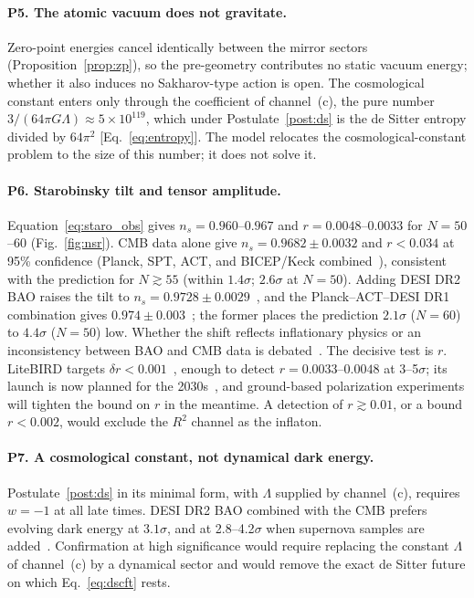\documentclass[reprint,aps,prd,amsmath,amssymb,superscriptaddress,nofootinbib,floatfix]{revtex4-2}
\theoremstyle{plain}
\theoremstyle{definition}
\theoremstyle{remark}
\begin{document}
\paragraph*{P5. The atomic vacuum does not gravitate.} Zero-point energies cancel identically between the mirror
sectors (Proposition~\ref{prop:zp}), so the pre-geometry contributes no static vacuum energy; whether it also induces no
Sakharov-type action is open. The cosmological constant enters only through the coefficient of channel~(c), the pure
number $3/(64\pi G\Lambda)\approx5\times10^{119}$, which under Postulate~\ref{post:ds} is the de Sitter entropy divided by $64\pi^2$
[Eq.~\eqref{eq:entropy}]. The model relocates the cosmological-constant problem to the size of this number; it does
not solve it.

\paragraph*{P6. Starobinsky tilt and tensor amplitude.} Equation~\eqref{eq:staro_obs} gives $n_s=0.960$--$0.967$ and
$r=0.0048$--$0.0033$ for $N=50$--$60$ (Fig.~\ref{fig:nsr}). CMB data alone give $n_s=0.9682\pm0.0032$ and $r<0.034$ at 95\%
confidence (Planck, SPT, ACT, and BICEP/Keck combined~\cite{Balkenhol2026}), consistent with the prediction for $N\gtrsim55$
(within $1.4\sigma$; $2.6\sigma$ at $N=50$). Adding
DESI DR2 BAO raises the tilt to $n_s=0.9728\pm0.0029$~\cite{Balkenhol2026}, and the Planck--ACT--DESI DR1 combination gives
$0.974\pm0.003$~\cite{ACTDR6}; the former places the prediction $2.1\sigma$ ($N=60$) to $4.4\sigma$ ($N=50$) low. Whether the shift reflects inflationary
physics or an inconsistency between BAO and CMB data is debated~\cite{Ferreira2026}. The decisive test is $r$. LiteBIRD
targets $\delta r<0.001$~\cite{LiteBIRD2023}, enough to detect $r=0.0033$--$0.0048$ at 3--5$\sigma$; its launch is now planned
for the 2030s~\cite{LiteBIRDJAXA}, and ground-based polarization experiments will tighten the bound on $r$ in the meantime. A detection of $r\gtrsim0.01$, or a
bound $r<0.002$, would exclude the $R^2$ channel as the inflaton.

\paragraph*{P7. A cosmological constant, not dynamical dark energy.} Postulate~\ref{post:ds} in its minimal form, with $\Lambda$
supplied by channel~(c), requires $w=-1$ at all late times. DESI DR2 BAO combined with the CMB prefers evolving dark
energy at $3.1\sigma$, and at 2.8--4.2$\sigma$ when supernova samples are added~\cite{DESIDR2}. Confirmation at high significance
would require replacing the constant $\Lambda$ of channel~(c) by a dynamical sector and would remove the exact de Sitter
future on which Eq.~\eqref{eq:dscft} rests.
\end{document}
